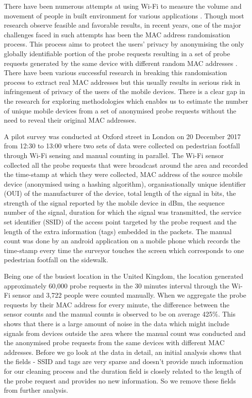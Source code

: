 \documentclass[11t, a4paper, twocolumn]{article}
\begin{document}
	There have been numerous attempts at using Wi-Fi
	to measure the volume and movement of people in built environment for various
	applications \citep{zarim2006,sap2015,reki2007}.
	Though most research observe feasible and favorable results,
	in recent years, one of the major challenges faced in such attempts
	has been the MAC address randomisation process.
	This process aims to protect the users' privacy by anonymising
	the only globally identifiable portion of the probe requests
	resulting in a set of probe requests generated by the same device
	with different random MAC addresses \citep{green2008}.
	There have been various successful research in breaking this
	randomisation process to extract real MAC addresses \citep{martin2017}
	but this usually results in serious risk in infringement of
	privacy of the users of the mobile devices.
	There is a clear gap in the research for exploring methodologies
	which enables us to estimate the number of unique mobile
	devices from a set of anonymised probe requests
	without the need to reveal their original MAC addresses.

	A pilot survey was conducted at Oxford street in London
	on 20 December 2017 from 12:30 to 13:00 where two sets of data
	were collected on pedestrian footfall through Wi-Fi sensing
	and manual counting in parallel.
	The Wi-Fi sensor collected all the probe requests that were 
	broadcast around the area and recorded
	the time-stamp at which they were collected,
	MAC address of the source mobile device
	(anonymised using a hashing algorithm),
	organisationally unique identifier (OUI) of the manufacturer of the device,
	total length of the signal in bits,
	the strength of the signal reported by the mobile device in dBm,
	the sequence number of the signal,
	duration for which the signal was transmitted, 
	the service set identifier (SSID) of the access point targeted
	by the probe request and 
	the length of the extra information (tags) embedded in the packets.
	The manual count was done by an android application on a mobile phone
	which records the time-stamp every time the surveyor touches the screen
	which corresponds to one pedestrian footfall on the sidewalk.

	Being one of the busiest location in the United Kingdom, the location
	generated approximately 60,000 probe requests in the 30 minutes
	interval through the Wi-Fi sensor and 3,722 people were counted manually.
	When we aggregate the probe requests by their MAC address for every minute,
	the difference between the sensor counts and the manual counts
	is observed to be on average 425\%. 
	This shows that there is a large amount of noise
	in the data which might include signals from devices outside the area where
	the manual count was conducted and the anonymised probe requests from the
	same devices with different MAC addresses.
	Before we go look at the data
	in detail, an initial analysis shows that the fields - SSID and tags are
	very sparse and doesn't provide much information for our cleaning process 
	and the duration field is closely related to the length of the 
	probe request and provides no new information.
	So we remove these fields from further analysis.
\end{document}
